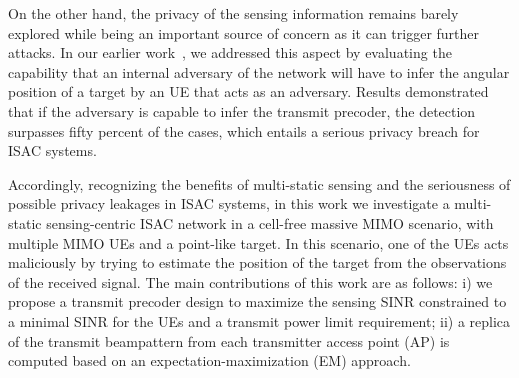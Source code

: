 \documentclass[conference,twocolumn,a4paper]{IEEEtran}
\theoremstyle{remark} \newtheorem{remark}{Remark}
\begin{document}
On the other hand, the privacy of the sensing information remains barely explored while being an important source of concern as it can trigger further attacks. In our earlier work~\cite{dasilva2023privacy}, we addressed this aspect by evaluating the capability that an internal adversary of the network will have to infer the angular position of a target by an UE that acts as an adversary. Results demonstrated that if the adversary is capable to infer the transmit precoder, the detection surpasses fifty percent of the cases, which entails a serious privacy breach for ISAC systems. 

Accordingly, recognizing the benefits of multi-static sensing and the seriousness of possible privacy leakages in ISAC systems, in this work we investigate a multi-static sensing-centric ISAC network in a cell-free massive MIMO scenario, with multiple MIMO UEs and a point-like target. In this scenario, one of the UEs acts maliciously by trying to estimate the position of the target from the observations of the received signal. The main contributions of this work are as follows: i) we propose a transmit precoder design to maximize the sensing SINR constrained to a minimal SINR for the UEs and a transmit power limit requirement; ii) a replica of the transmit beampattern from each transmitter access point (AP) is computed based on an expectation-maximization (EM) approach. 

\end{document}
